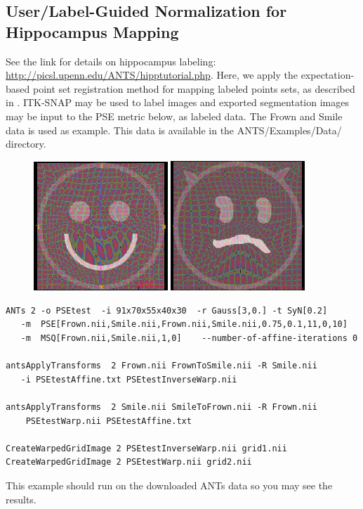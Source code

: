\documentclass{InsightArticle}
\begin{document}
\subsection{User/Label-Guided Normalization for Hippocampus Mapping}
See the link for details on hippocampus labeling:
\href{http://picsl.upenn.edu/ANTS/hipptutorial.php}{http://picsl.upenn.edu/ANTS/hipptutorial.php}.
Here, we apply the expectation-based point set registration method 
for mapping labeled points sets, as described in \cite{Pluta2008}.   ITK-SNAP may be used to label 
images and exported segmentation images may be input to the 
PSE metric below, as labeled data.  The Frown and Smile data is used 
as example.  This data is available in the 
ANTS/Examples/Data/ directory.
\begin{figure}
\includegraphics[width=0.45\textwidth]{Figures/frowntosmile.png}
\includegraphics[width=0.45\textwidth]{Figures/smiletofrown.png}
\label{fig:frown}
\end{figure}
\begin{verbatim}
ANTs 2 -o PSEtest  -i 91x70x55x40x30  -r Gauss[3,0.] -t SyN[0.2]
   -m  PSE[Frown.nii,Smile.nii,Frown.nii,Smile.nii,0.75,0.1,11,0,10] 
   -m  MSQ[Frown.nii,Smile.nii,1,0]    --number-of-affine-iterations 0 

antsApplyTransforms  2 Frown.nii FrownToSmile.nii -R Smile.nii
   -i PSEtestAffine.txt PSEtestInverseWarp.nii 

antsApplyTransforms  2 Smile.nii SmileToFrown.nii -R Frown.nii 
    PSEtestWarp.nii PSEtestAffine.txt 

CreateWarpedGridImage 2 PSEtestInverseWarp.nii grid1.nii
CreateWarpedGridImage 2 PSEtestWarp.nii grid2.nii
\end{verbatim}
This example should run on the downloaded ANTs data so you may see the results.
%
%
\newpage
\end{document}
